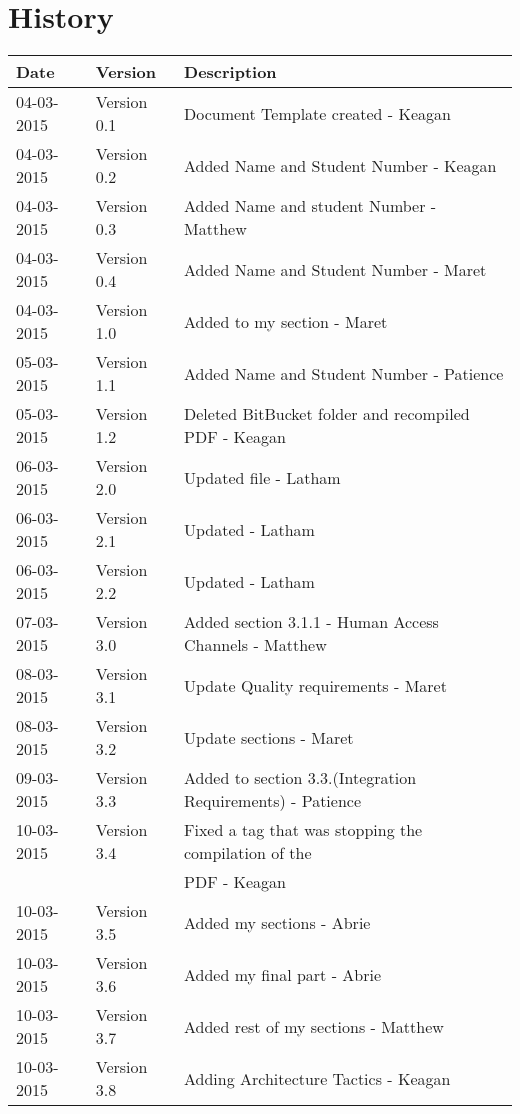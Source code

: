 \documentclass[hidelinks, 12pt]{article}
\begin{document}


\section{History}
\begin{tabular}{|l|l|l|}
\hline
Date & Version & Description\\
\hline
04-03-2015 & Version 0.1 & Document Template created - Keagan\\
\hline
04-03-2015 & Version 0.2 & Added Name and Student Number - Keagan\\
\hline
04-03-2015 & Version 0.3 & Added Name and student Number - Matthew\\
\hline
04-03-2015 & Version 0.4 & Added Name and Student Number - Maret\\
\hline
04-03-2015 & Version 1.0 & Added to my section - Maret\\
\hline
05-03-2015 & Version 1.1 & Added Name and Student Number - Patience\\
\hline
05-03-2015 & Version 1.2 & Deleted BitBucket folder and recompiled PDF - Keagan\\
\hline
06-03-2015 & Version 2.0 & Updated file - Latham\\
\hline
06-03-2015 & Version 2.1 & Updated - Latham\\
\hline
06-03-2015 & Version 2.2 & Updated - Latham\\
\hline
07-03-2015 & Version 3.0 & Added section 3.1.1 - Human Access Channels - Matthew\\
\hline
08-03-2015 & Version 3.1 & Update Quality requirements - Maret\\
\hline
08-03-2015 & Version 3.2 & Update sections - Maret\\
\hline
09-03-2015 & Version 3.3 & Added to section 3.3.(Integration Requirements) - Patience\\
\hline
10-03-2015 & Version 3.4 & Fixed a tag that was stopping the compilation of the \\&&PDF - Keagan\\
\hline
10-03-2015 & Version 3.5 & Added my sections - Abrie\\
\hline
10-03-2015 & Version 3.6 & Added my final part - Abrie\\
\hline
10-03-2015 & Version 3.7 & Added rest of my sections - Matthew\\
\hline
10-03-2015 & Version 3.8 & Adding Architecture Tactics - Keagan\\

\end{tabular}
\end{document}
